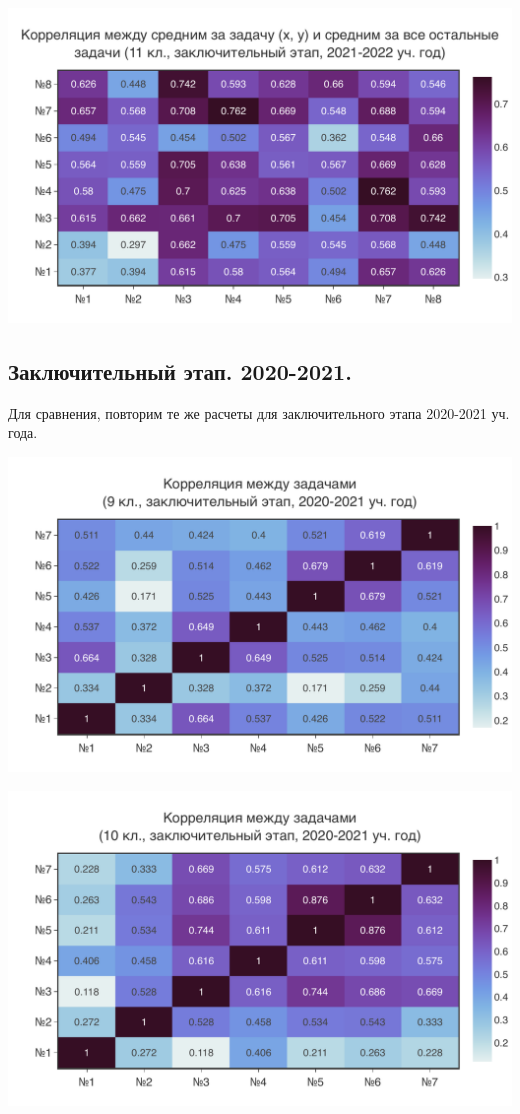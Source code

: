 \includegraphics[width=\linewidth]{../export/pdf/results/2022/respa/grade11-avg.pdf}

\subsection{Заключительный этап. 2020-2021.}

Для сравнения, повторим те же расчеты для заключительного этапа 2020-2021 уч. года.

\includegraphics[width=\linewidth]{../export/pdf/results/2021/respa/grade9.pdf}

\includegraphics[width=\linewidth]{../export/pdf/results/2021/respa/grade10.pdf}

